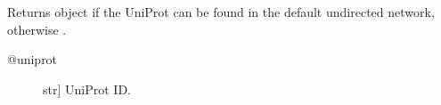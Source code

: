 \documentclass[letterpaper,10pt,english]{sphinxmanual}
\begin{document}
\begin{fulllineitems}
\begin{fulllineitems}
\end{fulllineitems}


\begin{fulllineitems}
\label{\detokenize{main:pypath.main.PyPath.uniq_ptm}}
\end{fulllineitems}


\begin{fulllineitems}
\label{\detokenize{main:pypath.main.PyPath.uniq_ptms}}
\end{fulllineitems}


\begin{fulllineitems}
\label{\detokenize{main:pypath.main.PyPath.up}}
Returns  object if the UniProt
can be found in the default undirected network,
otherwise .
\begin{description}
\item[{@uniprot}] \leavevmode{[}str{]}
UniProt ID.

\end{description}

\end{fulllineitems}


\begin{fulllineitems}
\label{\detokenize{main:pypath.main.PyPath.up_affected_by}}
\end{fulllineitems}


\begin{fulllineitems}
\label{\detokenize{main:pypath.main.PyPath.up_affects}}
\end{fulllineitems}



\end{fulllineitems}
\end{document}
